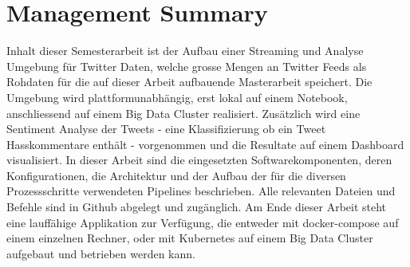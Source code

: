 
\chapter*{Management Summary}
\label{chap:managementSummary}

Inhalt dieser Semesterarbeit ist der Aufbau einer Streaming und Analyse Umgebung f{\"u}r Twitter Daten, welche grosse Mengen an Twitter Feeds als Rohdaten  f{\"u}r die auf dieser Arbeit aufbauende Masterarbeit speichert. Die Umgebung wird plattformunabh{\"a}ngig, erst lokal auf einem Notebook, anschliessend auf einem Big Data Cluster realisiert. Zus{\"a}tzlich wird  eine Sentiment Analyse der Tweets - eine Klassifizierung ob ein Tweet Hasskommentare enth{\"a}lt -  vorgenommen und die Resultate auf einem Dashboard visualisiert. In dieser Arbeit sind die eingesetzten Softwarekomponenten, deren Konfigurationen, die Architektur und der Aufbau der f{\"u}r die diversen Prozessschritte verwendeten Pipelines beschrieben. Alle relevanten Dateien und Befehle sind in Github abgelegt und zug{\"a}nglich. Am Ende dieser Arbeit steht eine lauff{\"a}hige Applikation zur Verf{\"u}gung, die entweder mit docker-compose auf einem einzelnen Rechner, oder mit Kubernetes auf einem Big Data Cluster aufgebaut und betrieben werden kann.


